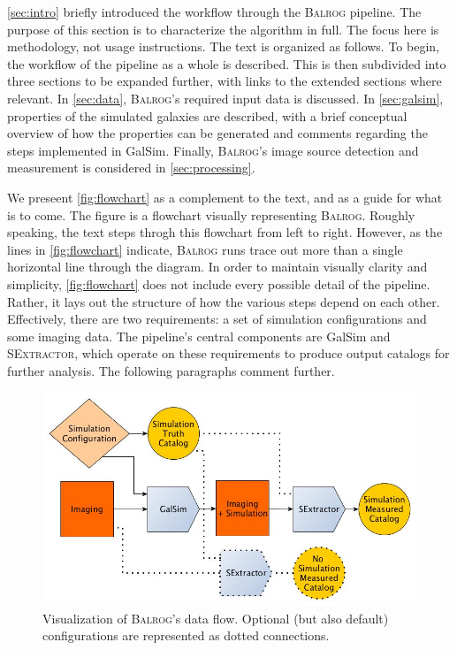 \documentclass[12pt]{book}
\newcommand{\galsim}{GalSim}
\newcommand{\balrog}{\textsc{Balrog}}
\newcommand{\sex}{\textsc{SExtractor}}
\begin{document}
\autoref{sec:intro} briefly introduced the workflow through the \balrog{} pipeline.
The purpose of this section is to characterize the algorithm in full.
The focus here is methodology, not usage instructions. 
The text is organized as follows.
To begin, the workflow of the pipeline as a whole is described.
This is then subdivided into three sections to be expanded further,
with links to the extended sections where relevant.
In \autoref{sec:data}, \balrog{}'s required input data is discussed.
In \autoref{sec:galsim}, properties of the simulated galaxies are described,
with a brief conceptual overview of how the properties can be generated
and comments regarding the steps implemented in \galsim{}.
Finally, \balrog{}'s image source detection and measurement is considered in \autoref{sec:processing}.

We preseent \autoref{fig:flowchart} as a complement to the text,
and as a guide for what is to come.
The figure is a flowchart visually representing \balrog{}.
Roughly speaking, the text steps throgh this flowchart from left to right.
However, as the lines in \autoref{fig:flowchart} indicate, \balrog{} runs trace out more than a single horizontal line through the diagram.
In order to maintain visually clarity and simplicity, \autoref{fig:flowchart} does not include every possible detail of the pipeline.
Rather, it lays out the structure of how the various steps depend on each other.
Effectively, there are two requirements: a set of simulation configurations and some imaging data.
The pipeline's central components are \galsim{} and \sex{}, which operate on these requirements
to produce output catalogs for further analysis.
The following paragraphs comment further.


\begin{figure}[h]
\includegraphics[width=0.9\linewidth]{flowchart.jpg}
\caption{Visualization of \balrog{}'s data flow. Optional (but also default) configurations are represented as dotted connections.}
\label{fig:flowchart}
\end{figure}
\end{document}
